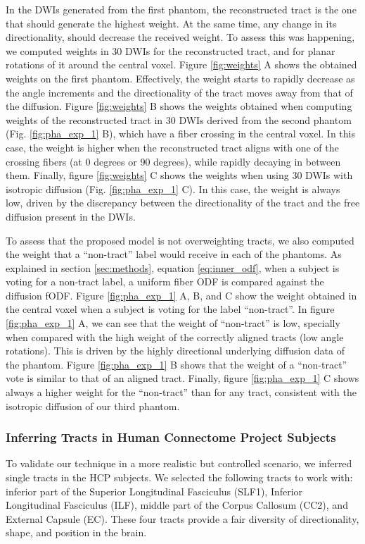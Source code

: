In the DWIs generated from the first phantom, the reconstructed tract is the one
that should generate the highest weight. At the same time, any change in its
directionality, should decrease the received weight. To assess this was happening,
we computed weights in 30 DWIs for the reconstructed tract, and for planar
rotations of it around the central voxel. Figure \ref{fig:weights} A shows the
obtained weights on the first phantom. Effectively, the weight starts to rapidly
decrease as the angle increments and the directionality of the tract moves away
from that of the diffusion. Figure \ref{fig:weights} B shows the weights obtained
when computing weights of the reconstructed tract in 30 DWIs derived from the
second phantom (Fig. \ref{fig:pha_exp_1} B), which have a fiber crossing in
the central voxel. In this case, the weight is higher when the reconstructed tract
aligns with one of the crossing fibers (at 0 degrees or 90 degrees), while rapidly
decaying in between them. Finally, figure \ref{fig:weights} C shows the weights
when using 30 DWIs with isotropic diffusion (Fig. \ref{fig:pha_exp_1} C). In this
case, the weight is always low, driven by the discrepancy between the
directionality of the tract and the free diffusion present in the DWIs.

To assess that the proposed model is not overweighting tracts, we also computed
the weight that a ``non-tract'' label would receive in each of the phantoms. As
explained in section \ref{sec:methods}, equation \ref{eq:inner_odf}, when a
subject is voting for a non-tract label, a uniform fiber ODF is compared against
the diffusion fODF. Figure \ref{fig:pha_exp_1} A, B, and C show the weight
obtained in the central voxel when a subject is voting for the label ``non-tract''.
In figure \ref{fig:pha_exp_1} A, we can see that the
weight of ``non-tract'' is low, specially when compared with the high weight
of the correctly aligned tracts (low angle rotations). This is driven by the
highly directional underlying diffusion data of the phantom. 
Figure \ref{fig:pha_exp_1} B shows that the weight of a ``non-tract'' vote is
similar to that of an aligned tract. Finally, figure \ref{fig:pha_exp_1} C
shows always a higher weight for the ``non-tract'' than for any tract, consistent
with the isotropic diffusion of our third phantom.

\subsubsection{Inferring Tracts in Human Connectome Project Subjects}
To validate our technique in a more realistic but controlled scenario, we
inferred single tracts in the HCP subjects. We selected the following tracts to
work with: inferior part of the Superior Longitudinal Fasciculus (SLF1),
Inferior Longitudinal Fasciculus (ILF), middle part of the
Corpus Callosum (CC2), and External Capsule (EC). These four tracts provide
a fair diversity of directionality, shape, and position in the brain.

